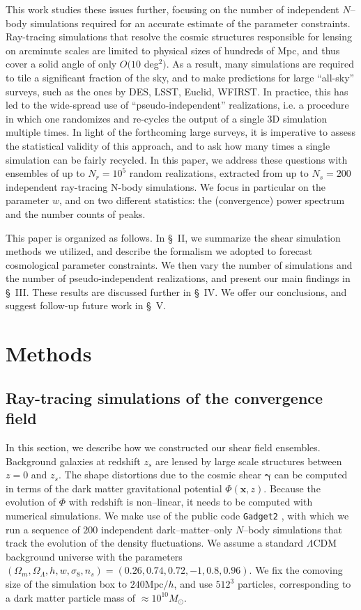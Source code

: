 \documentclass[reprint,aps,prd,superscriptaddress,showkeys,showpacs]{revtex4-1}
\newcommand{\bb}[1]{\mathbf{#1}}
\begin{document}
This work studies these issues further, focusing on the number of
independent $N$--body simulations required for an accurate estimate of
the parameter constraints.  Ray-tracing simulations that resolve the
cosmic structures responsible for lensing on arcminute scales are
limited to physical sizes of hundreds of Mpc, and thus cover a solid
angle of only $O(10$ deg$^2)$.  As a result, many simulations are
required to tile a significant fraction of the sky, and to make
predictions for large ``all-sky'' surveys, such as the ones by DES,
LSST, Euclid, WFIRST.  In practice, this has led to the wide-spread
use of ``pseudo-independent'' realizations, i.e. a procedure in which
one randomizes and re-cycles the output of a single 3D simulation
multiple times.  In light of the forthcoming large surveys, it is
imperative to assess the statistical validity of this approach, and to
ask how many times a single simulation can be fairly recycled.  In
this paper, we address these questions with ensembles of up to
$N_r=10^5$ random realizations, extracted from up to $N_s=200$
independent ray-tracing N-body simulations. We focus in particular on
the parameter $w$, and on two different statistics: the (convergence)
power spectrum and the number counts of peaks.


This paper is organized as follows.  In \S~II, we summarize the shear
simulation methods we utilized, and describe the formalism we adopted
to forecast cosmological parameter constraints. We then vary the
number of simulations and the number of pseudo-independent
realizations, and present our main findings in \S~III. These results
are discussed further in \S~IV.  We offer our conclusions, and suggest
follow-up future work in \S~V.


\section{Methods}

\subsection{Ray-tracing simulations of the convergence field}
\label{shearsim}
%
In this section, we describe how we constructed our shear field
ensembles. Background galaxies at redshift $z_s$ are lensed by large
scale structures between $z=0$ and $z_s$. The shape distortions due to
the cosmic shear $\pmb{\gamma}$ can be computed in terms of the dark
matter gravitational potential $\Phi(\bb{x},z)$. Because the evolution
of $\Phi$ with redshift is non--linear, it needs to be computed with
numerical simulations. We make use of the public code \texttt{Gadget2}
\citep{Gadget2}, with which we run a sequence of $200$ independent
dark--matter--only $N$--body simulations that track the evolution of
the density fluctuations. We assume a standard $\Lambda$CDM background
universe with the parameters
$(\Omega_m,\Omega_\Lambda,h,w,\sigma_8,n_s)=(0.26,0.74,0.72,-1,0.8,0.96)$.
We fix the comoving size of the simulation box to $240\mathrm{Mpc}/h$,
and use $512^3$ particles, corresponding to a dark matter particle
mass of $\approx 10^{10}M_\odot$.
\end{document}
